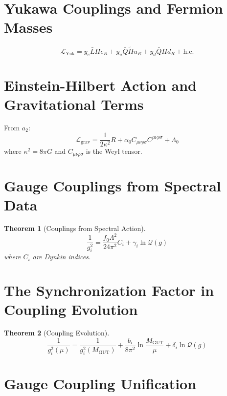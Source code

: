 \documentclass[11pt,a4paper,openright]{book}
\theoremstyle{plain}
\newtheorem{theorem}{Theorem}[chapter]
\theoremstyle{definition}
\newcommand{\MGUT}{M_{\mathrm{GUT}}}
\newcommand{\Lam}{\Lambda}
\begin{document}
\section{Yukawa Couplings and Fermion Masses}

\begin{equation}
\mathcal{L}_{\mathrm{Yuk}} = y_e \bar{L} H e_R + y_u \bar{Q} \tilde{H} u_R + y_d \bar{Q} H d_R + \text{h.c.}
\end{equation}

\section{Einstein-Hilbert Action and Gravitational Terms}

From $a_2$:
\begin{equation}
\mathcal{L}_{\mathrm{grav}} = \frac{1}{2\kappa^2} R + \alpha_0 C_{\mu\nu\rho\sigma}C^{\mu\nu\rho\sigma} + \Lam_0
\end{equation}
where $\kappa^2 = 8\pi G$ and $C_{\mu\nu\rho\sigma}$ is the Weyl tensor.

\section{Gauge Couplings from Spectral Data}

\begin{theorem}[Couplings from Spectral Action]
\begin{equation}
\frac{1}{g_i^2} = \frac{f_0 \Lam^2}{24\pi^2} C_i + \gamma_i \ln\mathcal{Q}(g)
\end{equation}
where $C_i$ are Dynkin indices.
\end{theorem}

\section{The Synchronization Factor in Coupling Evolution}

\begin{theorem}[Coupling Evolution]
\begin{equation}
\frac{1}{g_i^2(\mu)} = \frac{1}{g_i^2(\MGUT)} + \frac{b_i}{8\pi^2}\ln\frac{\MGUT}{\mu} + \delta_i \ln\mathcal{Q}(g)
\end{equation}
\end{theorem}

\section{Gauge Coupling Unification}
\end{document}
